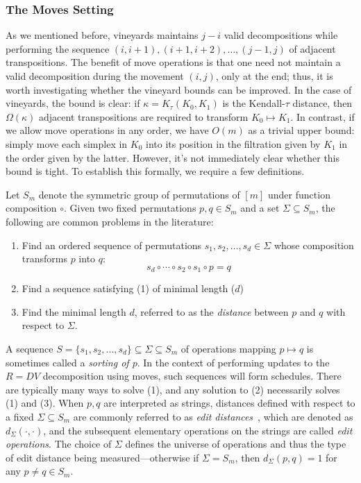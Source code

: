 \documentclass{article} %
\newcommand\sbullet[1][.5]{\mathbin{\vcenter{\hbox{\scalebox{#1}{$\bullet$}}}}}
\begin{document}
\subsubsection{The Moves Setting} 
As we mentioned before, vineyards maintains 
$j-i$ valid decompositions while 
performing the sequence 
$(i,i+1), (i+1,i+2), \ldots, (j-1,j)$
of adjacent transpositions. 
The benefit of move operations is that one need not maintain a valid decomposition during the movement $(i,j)$, only at the end; thus, it is worth investigating whether the vineyard bounds can be improved. 
In the case of vineyards, the bound is clear: 
if $\kappa = K_\tau(K_0, K_1)$ is the Kendall-$\tau$ distance, then $\Omega(\kappa)$ adjacent transpositions are required to transform $K_0 \mapsto K_1$. 
In contrast, if we allow move operations in any order, we have $O(m)$ as a trivial upper bound: simply move each simplex in $K_0$ into its position in the filtration given by $K_1$ in the order given by the latter. However, it's not immediately clear whether this bound is tight. To establish this formally, we require a few definitions.

Let $S_m$ denote the symmetric group  of   permutations of  $[m]$ under function composition $\circ$.
Given two fixed permutations $p, q \in S_m$ and a set $\Sigma \subseteq S_m$,  the following 
are common problems in the literature:
\begin{enumerate}
	\item Find an ordered sequence of permutations $s_1, s_2, \dots, s_d \in \Sigma$ whose composition transforms $p$ into $q$:
	\begin{displaymath}
		s_d \circ \cdots \circ s_2 \circ s_1 \circ p = q
	\end{displaymath}
	\item Find a sequence satisfying (1) of minimal length ($d$)
	\item Find the minimal length $d$, referred to as the \emph{distance} between $p$ and $q$ with respect to $\Sigma$. 
\end{enumerate}
A sequence $S = \{s_1, s_2, \dots, s_d\} \subseteq \Sigma \subseteq S_m$ of operations mapping $p \mapsto q$ is sometimes called a \emph{sorting of $p$}.
In the context of performing updates to the $R = D V$ decomposition using moves,  such sequences will form schedules. 
There are typically many ways to solve (1), and any solution to (2) necessarily solves (1) and (3). When $p, q$ are interpreted as strings, distances defined with respect to a fixed $\Sigma \subseteq S_m$ are commonly referred to as \emph{edit distances}~\cite{labarre2013lower}, which are denoted as $d_\Sigma(\cdot, \cdot)$, and the subsequent elementary operations on the strings are called \emph{edit operations}. 
The choice of $\Sigma$ defines the universe of operations and thus the type of edit distance being measured---otherwise if $\Sigma = S_m$, then $d_\Sigma(p, q) = 1$ for any $p\neq  q \in S_m$.
\end{document}
